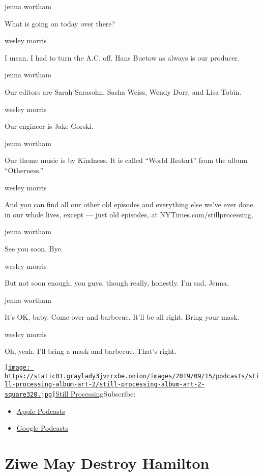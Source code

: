 jenna wortham

What is going on today over there?

wesley morris

I mean, I had to turn the A.C. off. Hans Buetow as always is our
producer.

jenna wortham

Our editors are Sarah Sarasohn, Sasha Weiss, Wendy Dorr, and Lisa Tobin.

wesley morris

Our engineer is Jake Gorski.

jenna wortham

Our theme music is by Kindness. It is called ``World Restart'' from the
album ``Otherness.''

wesley morris

And you can find all our other old episodes and everything else we've
ever done in our whole lives, except --- just old episodes, at
NYTimes.com/stillprocessing.

jenna wortham

See you soon. Bye.

wesley morris

But not soon enough, you guys, though really, honestly. I'm sad, Jenna.

jenna wortham

It's OK, baby. Come over and barbecue. It'll be all right. Bring your
mask.

wesley morris

Oh, yeah. I'll bring a mask and barbecue. That's right.

\href{https://www.nytimes3xbfgragh.onion/column/still-processing-podcast}{\texttt{[image: https://static01.graylady3jvrrxbe.onion/images/2019/09/15/podcasts/still-processing-album-art-2/still-processing-album-art-2-square320.jpg]}Still
Processing}Subscribe:

\begin{itemize}
\tightlist
\item
  \href{https://itunes.apple.com/us/podcast/id1151436460}{Apple
  Podcasts}
\item
  \href{https://www.google.com/podcasts?feed=aHR0cHM6Ly9yc3MuYXJ0MTkuY29tL255dC1zdGlsbC1wcm9jZXNzaW5n}{Google
  Podcasts}
\end{itemize}

\hypertarget{ziwe-may-destroy-hamilton-1}{%
\section{Ziwe May Destroy Hamilton}\label{ziwe-may-destroy-hamilton-1}}


